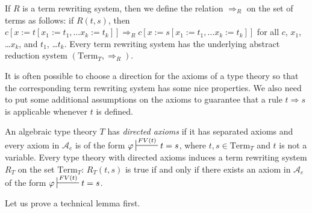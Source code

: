 \documentclass[reqno]{amsart}
\theoremstyle{definition}
\theoremstyle{remark}
\newcommand{\repl}{:=}
\newcommand{\Term}{\mathrm{Term}}
\numberwithin{figure}{section}
\begin{document}
If $R$ is a term rewriting system, then we define the relation $\Rightarrow_R$ on the set of terms as follows:
if $R(t,s)$, then $c[x \repl t[x_1 \repl t_1, \ldots x_k \repl t_k]] \Rightarrow_R c[x \repl s[x_1 \repl t_1, \ldots x_k \repl t_k]]$ for all $c$, $x_1$, \ldots $x_k$, and $t_1$, \ldots $t_k$.
Every term rewriting system has the underlying abstract reduction system $(\Term_T,\Rightarrow_R)$.

It is often possible to choose a direction for the axioms of a type theory so that the corresponding term rewriting system has some nice properties.
We also need to put some additional assumptions on the axioms to guarantee that a rule $t \Rightarrow s$ is applicable whenever $t$ is defined.

\begin{defn}[directed]
An algebraic type theory $T$ has \emph{directed axioms} if it has separated axioms and every axiom in $\mathcal{A}_e$ is of the form $\varphi \sststile{}{FV(t)} t = s$, where $t,s \in \Term_T$ and $t$ is not a variable.
Every type theory with directed axioms induces a term rewriting system $R_T$ on the set $\Term_T$: $R_T(t,s)$ is true if and only if there exists an axiom in $\mathcal{A}_e$ of the form $\varphi \sststile{}{FV(t)} t = s$.
\end{defn}

Let us prove a technical lemma first.
\end{document}
